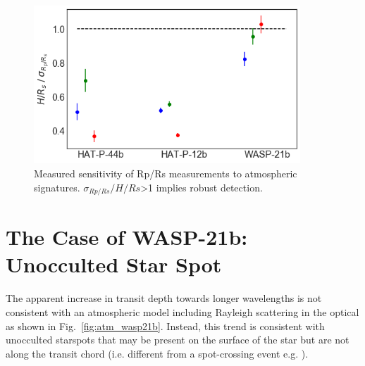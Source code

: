 \begin{figure}
\centering
	\includegraphics[width=10cm]{figures/H-sigRpRs.png}
    \caption{Measured sensitivity of Rp/Rs measurements to atmospheric signatures. $\sigma_{Rp/Rs}/H/Rs$>1 implies robust detection.}\label{fig:HRs-sigRpRs}
\end{figure}



\section{The Case of WASP-21b: Unocculted Star Spot} \label{sec:spots}
The apparent increase in transit depth towards longer wavelengths is not consistent with an atmospheric model including Rayleigh scattering in the optical as shown in Fig.~\ref{fig:atm_wasp21b}. Instead, this trend is consistent with unocculted starspots that may be present on the surface of the star but are not along the transit chord (i.e. different from a spot-crossing event e.g. \cite{Pont2008}). %

